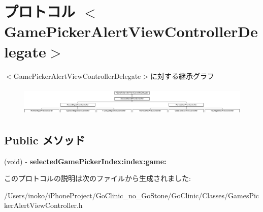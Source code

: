\hypertarget{protocol_game_picker_alert_view_controller_delegate-p}{
\section{プロトコル $<$GamePickerAlertViewControllerDelegate$>$}
\label{protocol_game_picker_alert_view_controller_delegate-p}
}
$<$GamePickerAlertViewControllerDelegate$>$に対する継承グラフ\begin{figure}[H]
\begin{center}
\leavevmode
\includegraphics[height=1.419518cm]{protocol_game_picker_alert_view_controller_delegate-p}
\end{center}
\end{figure}
\subsection*{Public メソッド}
\begin{DoxyCompactItemize}
\item 
\hypertarget{protocol_game_picker_alert_view_controller_delegate-p_a5052d3b9d008f25ea3b0b9abd243afb7}{
(void) -\/ {\bfseries selectedGamePickerIndex:index:game:}}
\label{protocol_game_picker_alert_view_controller_delegate-p_a5052d3b9d008f25ea3b0b9abd243afb7}

\end{DoxyCompactItemize}


このプロトコルの説明は次のファイルから生成されました:\begin{DoxyCompactItemize}
\item 
/Users/inoko/iPhoneProject/GoClinic\_\-no\_\-GoStone/GoClinic/Classes/GamesPickerAlertViewController.h\end{DoxyCompactItemize}
